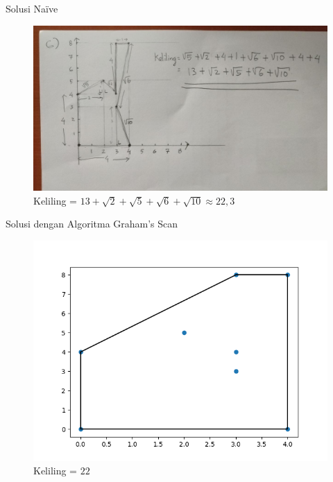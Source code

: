 \documentclass[english,t]{beamer}
\begin{document}
\begin{frame}{Solusi Na\"ive}
\begin{figure}[!ht]
	\centering
	\includegraphics[scale=.26]{images/solusi-soal-6}
	\caption{Keliling = $13 + \sqrt{2} + \sqrt{5} + \sqrt{6} + \sqrt{10} \approx 22,3$}
\end{figure}
\end{frame}

\begin{frame}{Solusi dengan Algoritma Graham's Scan}
	\begin{figure}[!ht]
		\centering
		\includegraphics[scale=.6]{images/convex-hull-answer}
		\caption{Keliling = $22$ \citep{halim2013competitive,scipy2022convex}}
	\end{figure}
\end{frame}
\end{document}
